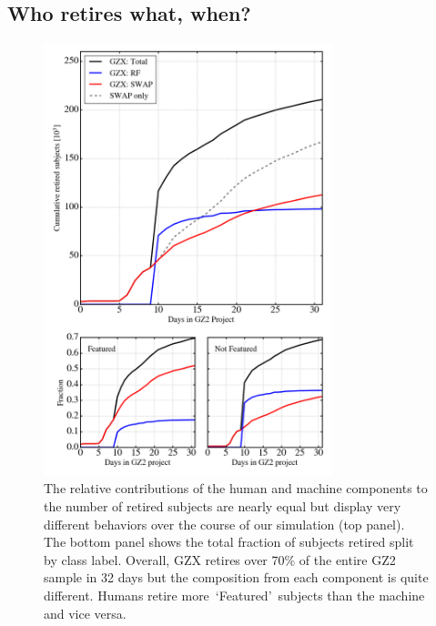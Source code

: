 \documentclass[twocolumn]{aastex6}
\newcommand{\feat}{`Featured'}
\begin{document}

\subsection{Who retires what, when?}  

\begin{figure}[t!]
\includegraphics[width=3.3in]{figures/GZ2_sup_PLPD5_p5_flipfeature2b_RF_accuracy_redo_raw_combo_GZX_component_contributions.png}
\caption{The relative contributions of the human and machine components to the number of retired subjects are nearly equal but display very different behaviors over the course of our simulation (top panel). The bottom panel shows the total fraction of subjects retired split by class label. Overall, GZX retires over 70\% of the entire GZ2 sample in 32 days but the composition from each component is quite different. Humans retire more~\feat~subjects than the machine and vice versa. \label{fig: gzx components}}
\end{figure}
\end{document}

